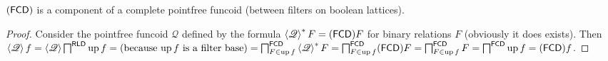 \begin{thm}
  $(\mathsf{FCD})$ is a component of a complete pointfree funcoid
  (between filters on boolean lattices).
\end{thm}

\begin{proof}
  Consider the pointfree funcoid $\mathscr{Q}$ defined by the formula
  $\left\langle \mathscr{Q} \right\rangle^{\ast} F = (\mathsf{FCD}) F$
  for binary relations $F$ (obviously it does exists). Then $\left\langle
  \mathscr{Q} \right\rangle f = \left\langle \mathscr{Q} \right\rangle
  \bigsqcap^{\mathsf{RLD}} \operatorname{up} f = \text{(because $\operatorname{up} f$
  is a filter base)} = \bigsqcap^{\mathsf{FCD}}_{F \in \operatorname{up} f}
  \left\langle \mathscr{Q} \right\rangle^{\ast} F =
  \bigsqcap^{\mathsf{FCD}}_{F \in \operatorname{up} f} (\mathsf{FCD}) F
  = \bigsqcap^{\mathsf{FCD}}_{F \in \operatorname{up} f} F =
  \bigsqcap^{\mathsf{FCD}} \operatorname{up} f = (\mathsf{FCD}) f$.
\end{proof}
